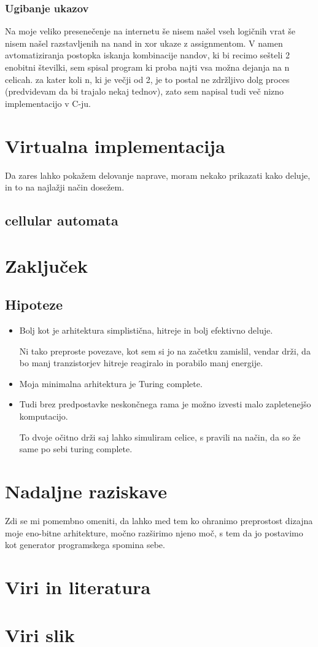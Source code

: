 \documentclass[12pt]{article}
\begin{document}
\subsubsection{Ugibanje ukazov}
Na moje veliko presenečenje na internetu še nisem našel vseh logičnih vrat še nisem našel razstavljenih na nand in xor ukaze z assignmentom.
V namen avtomatiziranja postopka iskanja kombinacije nandov, ki bi recimo sešteli 2 enobitni številki, sem spisal program ki proba najti vsa možna dejanja na n celicah.
za kater koli n, ki je večji od 2, je to postal ne zdržljivo dolg proces (predvidevam da bi trajalo nekaj tednov),  zato sem napisal tudi več nizno implementacijo v C-ju.

\section{Virtualna implementacija}
Da zares lahko pokažem delovanje naprave, moram nekako prikazati kako deluje, in to na najlažji način dosežem. %
\subsection{cellular automata}
\section{Zaključek}
\subsection{Hipoteze}
\begin{itemize}
  \item Bolj kot je arhitektura simplistična, hitreje in bolj efektivno deluje.

        Ni tako preproste povezave, kot sem si jo na začetku zamislil, vendar drži, da bo manj tranzistorjev hitreje reagiralo in porabilo manj energije.

  \item Moja minimalna arhitektura je Turing complete.
  \item Tudi brez predpostavke neskončnega rama je možno izvesti malo zapletenejšo komputacijo.

        To dvoje očitno drži saj lahko simuliram celice, s pravili na način, da so že same po sebi turing complete.
\end{itemize}

\section{Nadaljne raziskave}
Zdi se mi pomembno omeniti, da lahko med tem ko ohranimo preprostost dizajna moje eno-bitne arhitekture, močno razširimo njeno moč, s tem da jo postavimo kot generator programskega spomina sebe.

\pagebreak
\section{Viri in literatura}

\pagebreak
\section{Viri slik}
\end{document}

